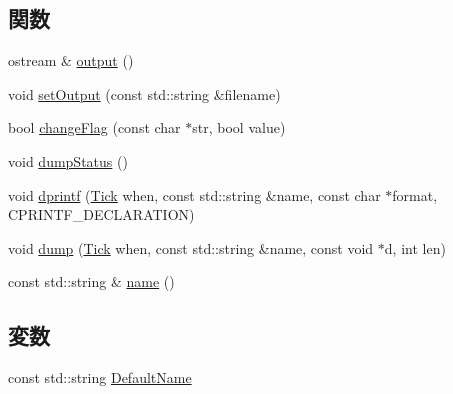 \subsection*{関数}
\begin{DoxyCompactItemize}
\item 
ostream \& \hyperlink{namespaceTrace_a926e8ac599a26341584088a3d3eec751}{output} ()
\item 
void \hyperlink{namespaceTrace_a328abf4c8a23042eb4edd3b0807b81ab}{setOutput} (const std::string \&filename)
\item 
bool \hyperlink{namespaceTrace_a0906ddd3d2ff2195baef2184cd546aa3}{changeFlag} (const char $\ast$str, bool value)
\item 
void \hyperlink{namespaceTrace_a63d683419f79ed96f6bc3032736c4d4d}{dumpStatus} ()
\item 
void \hyperlink{namespaceTrace_abeb8fab1f3446f7c844c2770dab2c616}{dprintf} (\hyperlink{base_2types_8hh_a5c8ed81b7d238c9083e1037ba6d61643}{Tick} when, const std::string \&name, const char $\ast$format, CPRINTF\_\-DECLARATION)
\item 
void \hyperlink{namespaceTrace_a2fa429d80084fb5be809ab7b728be345}{dump} (\hyperlink{base_2types_8hh_a5c8ed81b7d238c9083e1037ba6d61643}{Tick} when, const std::string \&name, const void $\ast$d, int len)
\item 
const std::string \& \hyperlink{trace_8hh_a166fa10b86d8faa127fb7c78191e3e60}{name} ()
\end{DoxyCompactItemize}
\subsection*{変数}
\begin{DoxyCompactItemize}
\item 
const std::string \hyperlink{namespaceTrace_a9e50643ecd3b22ed7ac6c78cfe9c267f}{DefaultName}
\end{DoxyCompactItemize}


